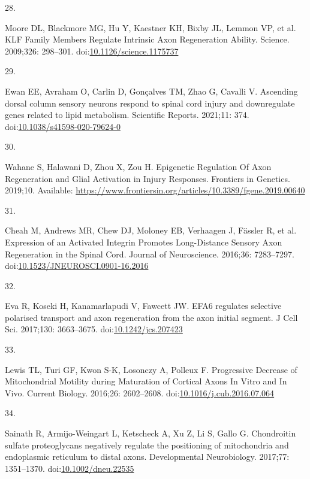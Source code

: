 \documentclass[
  12pt,
  a4paper,
]{book}
\newlength{\cslhangindent}
\newlength{\csllabelwidth}
\newlength{\cslentryspacingunit} %
\newenvironment{CSLReferences}[2] %
 {%
  \setlength{\parindent}{0pt}
  \ifodd #1
  \let\oldpar\par
  \def\par{\hangindent=\cslhangindent\oldpar}
  \fi
  \setlength{\parskip}{#2\cslentryspacingunit}
 }%
 {}
\newcommand{\CSLLeftMargin}[1]{\parbox[t]{\csllabelwidth}{#1}}
\newcommand{\CSLRightInline}[1]{\parbox[t]{\linewidth - \csllabelwidth}{#1}\break}
\begin{document}
\begin{CSLReferences}{0}{0}
\leavevmode{}%
\CSLLeftMargin{28. }%
\CSLRightInline{Moore DL, Blackmore MG, Hu Y, Kaestner KH, Bixby JL, Lemmon VP, et al. {KLF Family Members Regulate Intrinsic Axon Regeneration Ability}. Science. 2009;326: 298--301. doi:\href{https://doi.org/10.1126/science.1175737}{10.1126/science.1175737}}

\leavevmode{}%
\CSLLeftMargin{29. }%
\CSLRightInline{Ewan EE, Avraham O, Carlin D, Gonçalves TM, Zhao G, Cavalli V. Ascending dorsal column sensory neurons respond to spinal cord injury and downregulate genes related to lipid metabolism. Scientific Reports. 2021;11: 374. doi:\href{https://doi.org/10.1038/s41598-020-79624-0}{10.1038/s41598-020-79624-0}}

\leavevmode{}%
\CSLLeftMargin{30. }%
\CSLRightInline{Wahane S, Halawani D, Zhou X, Zou H. Epigenetic {Regulation Of Axon Regeneration} and {Glial Activation} in {Injury Responses}. Frontiers in Genetics. 2019;10. Available: \url{https://www.frontiersin.org/articles/10.3389/fgene.2019.00640}}

\leavevmode{}%
\CSLLeftMargin{31. }%
\CSLRightInline{Cheah M, Andrews MR, Chew DJ, Moloney EB, Verhaagen J, Fässler R, et al. Expression of an {Activated Integrin Promotes Long-Distance Sensory Axon Regeneration} in the {Spinal Cord}. Journal of Neuroscience. 2016;36: 7283--7297. doi:\href{https://doi.org/10.1523/JNEUROSCI.0901-16.2016}{10.1523/JNEUROSCI.0901-16.2016}}

\leavevmode{}%
\CSLLeftMargin{32. }%
\CSLRightInline{Eva R, Koseki H, Kanamarlapudi V, Fawcett JW. {EFA6} regulates selective polarised transport and axon regeneration from the axon initial segment. J Cell Sci. 2017;130: 3663--3675. doi:\href{https://doi.org/10.1242/jcs.207423}{10.1242/jcs.207423}}

\leavevmode{}%
\CSLLeftMargin{33. }%
\CSLRightInline{Lewis TL, Turi GF, Kwon S-K, Losonczy A, Polleux F. Progressive {Decrease} of {Mitochondrial Motility} during {Maturation} of {Cortical Axons In Vitro} and {In Vivo}. Current Biology. 2016;26: 2602--2608. doi:\href{https://doi.org/10.1016/j.cub.2016.07.064}{10.1016/j.cub.2016.07.064}}

\leavevmode{}%
\CSLLeftMargin{34. }%
\CSLRightInline{Sainath R, Armijo-Weingart L, Ketscheck A, Xu Z, Li S, Gallo G. Chondroitin sulfate proteoglycans negatively regulate the positioning of mitochondria and endoplasmic reticulum to distal axons. Developmental Neurobiology. 2017;77: 1351--1370. doi:\href{https://doi.org/10.1002/dneu.22535}{10.1002/dneu.22535}}


\end{CSLReferences}
\end{document}
